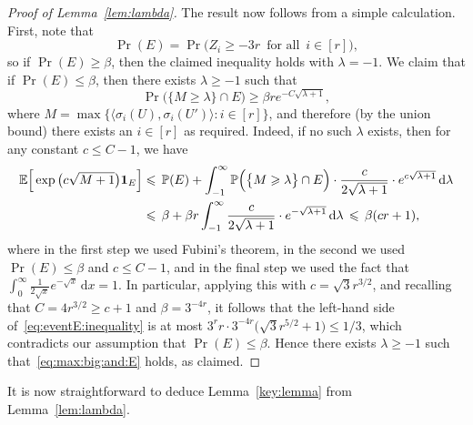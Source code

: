\begin{proof}[Proof of Lemma~\ref{lem:lambda}]
The result now follows from a simple calculation. First, note that 
$$\Pr(E) = \Pr\Big( Z_i \ge - 3r \, \text{ for all } \, i \in [r] \Big),$$
so if $\Pr(E) \ge \beta$, then the claimed inequality holds with $\lambda = -1$. We claim that if $\Pr(E) \le \beta$, then there exists $\lambda \ge -1$ such that
\begin{equation}\label{eq:max:big:and:E}
 \Pr\Big( \big\{ M \ge \lambda \big\} \cap E \Big) \ge \beta r e^{-C\sqrt{\lambda + 1}},
\end{equation}
where $M = \max \big\{ \big\langle \sigma_i(U),\sigma_i(U') \big\rangle : i \in [r] \big\}$, 
and therefore (by the union bound) there exists an $i \in [r]$ as required. Indeed, if no such $\lambda$ exists, then for any constant $c \le C - 1$, we have
\begin{align*}
\mathbb{E}\Big[ \exp\big( c \sqrt{M + 1} \big) \mathbf{1}_E \Big]
& \leqslant \, \mathbb{P}(E) + \int_{-1}^\infty \mathbb{P}\Big( \big\{ M \geqslant \lambda \big\} \cap E \Big) \cdot \frac{c}{2\sqrt{\lambda + 1}} \cdot e^{c \sqrt{\lambda + 1}} \,\mathrm{d}\lambda\\
& \leqslant \, \beta + \beta r \int_{-1}^\infty \frac{c}{2\sqrt{\lambda + 1}} \cdot e^{- \sqrt{\lambda + 1}} \,\mathrm{d}\lambda \, \leqslant \, \beta (cr + 1),
\end{align*}
where in the first step we used Fubini's theorem, in the second we used $\Pr(E) \le \beta$ and $c \le C - 1$, and in the final step we used the fact that $\int_0^\infty \frac{1}{2\sqrt{x}} e^{-\sqrt{x}} \, \mathrm{d}x = 1$. In particular, applying this with $c = \sqrt{3}r^{3/2}$, and recalling that $C = 4r^{3/2} \ge c + 1$ and $\beta = 3^{-4r}$, it follows that the left-hand side of~\eqref{eq:eventE:inequality} is at most $3^r r \cdot 3^{-4r} \big( \sqrt{3}r^{5/2} + 1 \big) \le 1/3$, which contradicts our assumption that $\Pr(E) \le \beta$. Hence there exists $\lambda \ge -1$ such that~\eqref{eq:max:big:and:E} holds, as claimed.
\end{proof}

It is now straightforward to deduce Lemma~\ref{key:lemma} from Lemma~\ref{lem:lambda}. 



